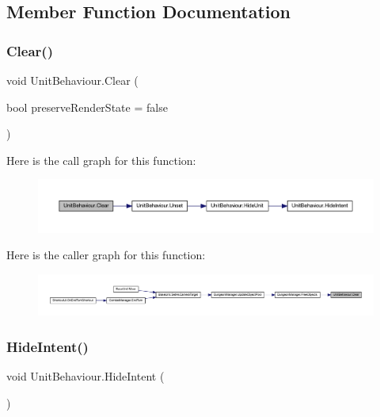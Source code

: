 \subsection{Member Function Documentation}
\mbox{\label{class_unit_behaviour_a89fa86241b11f695b89b7143fa4f88ec}} 
\subsubsection{\texorpdfstring{Clear()}{Clear()}}
{\footnotesize\ttfamily void Unit\+Behaviour.\+Clear (\begin{DoxyParamCaption}\item[{bool}]{preserve\+Render\+State = {\ttfamily false} }\end{DoxyParamCaption})}

Here is the call graph for this function\+:\nopagebreak
\begin{figure}[H]
\begin{center}
\leavevmode
\includegraphics[width=350pt]{class_unit_behaviour_a89fa86241b11f695b89b7143fa4f88ec_cgraph}
\end{center}
\end{figure}
Here is the caller graph for this function\+:\nopagebreak
\begin{figure}[H]
\begin{center}
\leavevmode
\includegraphics[width=350pt]{class_unit_behaviour_a89fa86241b11f695b89b7143fa4f88ec_icgraph}
\end{center}
\end{figure}
\mbox{\label{class_unit_behaviour_a9ba9de594c111333c048b477dd295025}} 
\subsubsection{\texorpdfstring{HideIntent()}{HideIntent()}}
{\footnotesize\ttfamily void Unit\+Behaviour.\+Hide\+Intent (\begin{DoxyParamCaption}{ }\end{DoxyParamCaption})}

